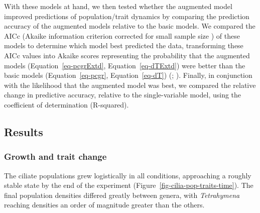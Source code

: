 \documentclass[
  letterpaper,
  DIV=11,
  numbers=noendperiod]{scrartcl}
\begin{document}
With these models at hand, we then tested whether the augmented model
improved predictions of population/trait dynamics by comparing the
prediction accuracy of the augmented models relative to the basic
models. We compared the AICc (Akaike information criterion corrected for
small sample size )
of these models to determine which model best predicted the data,
transforming these AICc values into Akaike scores representing the
probability that the augmented models (Equation~\ref{eq-pcgrExtd},
Equation~\ref{eq-dTExtd}) were better than the basic models
(Equation~\ref{eq-pcgr}, Equation~\ref{eq-dT})
(;
). Finally, in
conjunction with the likelihood that the augmented model was best, we
compared the relative change in predictive accuracy, relative to the
single-variable model, using the coefficient of determination
(R-squared).

\subsection{Results}\label{sec-DAE_results}

\subsubsection{Growth and trait change}\label{growth-and-trait-change}

The ciliate populations grew logistically in all conditions, approaching
a roughly stable state by the end of the experiment
(Figure~\ref{fig-cilia-pop-traits-time}). The final population densities
differed greatly between genera, with \emph{Tetrahymena} reaching
densities an order of magnitude greater than the others.
\end{document}
